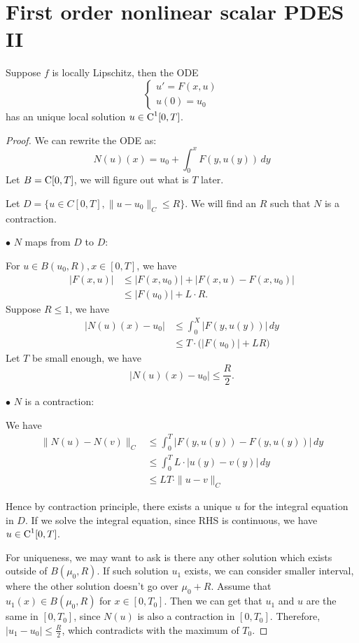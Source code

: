 \newpage
\section{First order nonlinear scalar PDES II}

\begin{theorem}
    Suppose $f$ is locally Lipschitz, then the ODE 
    \[
    \begin{cases}
        u' = F(x,u)\\ 
        u(0) = u_0
    \end{cases}    
    \]
    has an unique local solution $u\in \operatorname{C}^1[0,T]$.
\end{theorem}
\begin{proof}
    We can rewrite the ODE as: 
    \[
        N(u)(x) = u_0 + \int_0^x F(y,u(y))\,dy  
    \]
    Let $B =\operatorname{C} [0,T]$, we will figure out what is $T$ later.  

    Let $D = \{u\in C[0,T], \|u-u_0\|_C\le R\}$. We will find an $R$ such that $N$ is a contraction. 
    
\vspace{1em}
    \noindent$\bullet$ $N$ maps from $D$ to $D$:

    For $u\in B(u_0,R), x\in [0,T]$, we have 
    \begin{align*}
        |F(x,u)| &\le |F(x,u_0)| + |F(x,u) - F(x,u_0)| \\  
        &\le |F(u_0)| + L\cdot R.    
    \end{align*}
    Suppose $R\le 1$, we have 
    \begin{align*}
        |N(u)(x)-u_0| &\le \int_0^X |F(y,u(y))|\,dy \\     
        &\le T\cdot  \Big( |F(u_0)| +LR \Big)
    \end{align*}
    Let $T$ be small enough, we have 
    \[
        |N(u)(x) - u_0|\le \frac{R}{2}.    
    \]

    \vspace{1em}
    \noindent $\bullet$ $N$ is a contraction: 

    We have 
    \begin{align*}
        \|N(u) - N(v)\|_C &\le \int_0^T \big|F(y,u(y) ) - F(y,u(y)) \big|\, dy\\
        &\le \int_0^T L\cdot |u(y)-v(y)| \, dy\\
        &\le LT\cdot \|u-v\|_C
    \end{align*}

Hence by contraction principle, there exists a unique $u$ for the integral equation in $D$. If we solve the integral equation, since RHS is continuous, we have $u\in \operatorname{C}^1[0,T]$.

For uniqueness, we may want to ask is there any other solution which exists outside of $B(\mu_0,R)$. If such solution $u_1$ exists, we can consider smaller interval, where the other solution doesn't go over $\mu_0+R$. Assume that $u_1(x) \in B(\mu_0, R)$ for $x\in [0,T_0]$. Then we can get that $u_1$ and $u$ are the same in $[0,T_0]$, since $N(u)$ is also a contraction in $[0,T_0]$. Therefore, $|u_1-u_0|\le \frac R 2$, which contradicts with the maximum of $T_0$. 
\end{proof}

